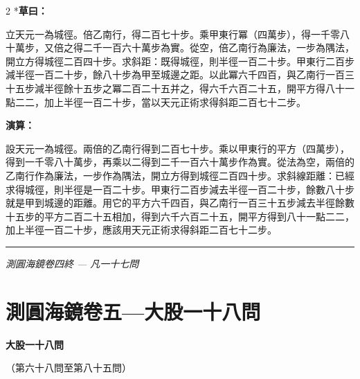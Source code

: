\documentclass[11pt,a4paper]{article}
\newcommand{\longline}{\noindent\rule{\textwidth}{0.4pt}}
\newcounter{probnum}
\begin{document}
\begin{paracol}{2}
\switchcolumn[0]*\textbf{草曰：}

\small 立天元一為城徑。倍乙南行，得二百七十步。乘甲東行冪（四萬步），得一千零八十萬步，又倍之得二千一百六十萬步為實。從空，倍乙南行為廉法，一步為隅法，開立方得城徑二百四十步。求斜距：既得城徑，則半徑一百二十步。甲東行二百步減半徑一百二十步，餘八十步為甲至城邊之距。以此冪六千四百，與乙南行一百三十五步減半徑餘十五步之冪二百二十五并之，得六千六百二十五，開平方得八十一點二二，加上半徑一百二十步，當以天元正術求得斜距二百七十二步。

\switchcolumn\textbf{演算：}

\small 設天元一為城徑。兩倍的乙南行得到二百七十步。乘以甲東行的平方（四萬步），得到一千零八十萬步，再乘以二得到二千一百六十萬步作為實。從法為空，兩倍的乙南行作為廉法，一步作為隅法，開立方得到城徑二百四十步。求斜線距離：已經求得城徑，則半徑是一百二十步。甲東行二百步減去半徑一百二十步，餘數八十步就是甲到城邊的距離。用它的平方六千四百，與乙南行一百三十五步減去半徑餘數十五步的平方二百二十五相加，得到六千六百二十五，開平方得到八十一點二二，加上半徑一百二十步，應該用天元正術求得斜距二百七十二步。
\end{paracol}

\vspace{0.1cm}
\noindent{}
\par\vspace{0.3cm}

\vspace{0.5cm}
\longline
\begin{center}
\textit{測圓海鏡卷四終 --- 凡一十七問}
\end{center}
\newpage

\setcounter{probnum}{67}
\section{測圓海鏡卷五---大股一十八問}
\label{sec:vol5}

\begin{center}
{\Large\bfseries\color{volcolor} 大股一十八問}

\vspace{0.2cm}
{\small\color{notecolor} （第六十八問至第八十五問）}
\end{center}
\end{document}
